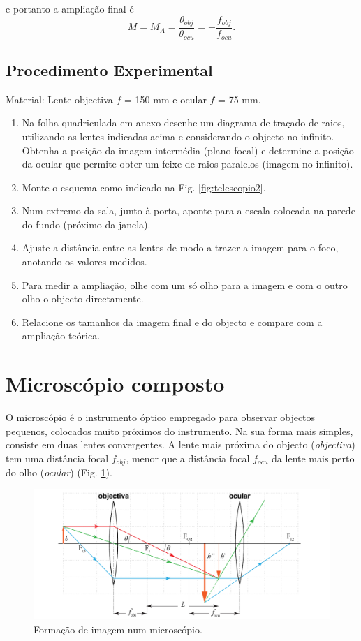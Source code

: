 \documentclass[a4paper,12pt]{article}      %
\begin{document}
e portanto a ampliação final é
\begin{equation}
M=M_A =\frac{\theta_{obj}}{\theta_{ocu}}= -\frac{f_{obj}}{f_{ocu}}.
\end{equation}

\subsection{\sf Procedimento Experimental}

Material: Lente objectiva $f$ = 150 mm e ocular $f$ = 75 mm.

\begin{enumerate}
\item Na folha quadriculada em anexo desenhe um diagrama de traçado de raios, utilizando as lentes indicadas acima e considerando o objecto no infinito. Obtenha a posição da imagem intermédia (plano focal) e determine a posição da ocular que permite obter um feixe de raios paralelos (imagem no infinito).
\item Monte o esquema como indicado na Fig. \ref{fig:telescopio2}.
\item Num extremo da sala, junto à porta, aponte para a escala colocada na parede do fundo (próximo da janela).
\item Ajuste a distância entre as lentes de modo a trazer a imagem para o foco, anotando os valores medidos.
\item Para medir a ampliação, olhe com um só olho para a imagem e com o outro olho o objecto directamente.
\item Relacione os tamanhos da imagem final e do objecto e compare com a ampliação teórica.
\end{enumerate}


\section{\sf Microscópio composto}

O microscópio é o instrumento óptico empregado para observar objectos pequenos, colocados muito próximos do instrumento. Na sua forma mais simples, consiste em duas lentes convergentes. A lente mais próxima do objecto (\emph{objectiva}) tem uma distância focal $f_{obj}$, menor que a distância focal $f_{ocu}$ da lente mais perto do olho (\emph{ocular}) (Fig. \ref{fig:microscopio}).

\begin{figure}
	[!htb]  \centering 
	\includegraphics[width=1.0\textwidth]{microscopio}
		\caption{Formação de imagem num microscópio. \label{fig:microscopio}} 
\end{figure}
\end{document}
